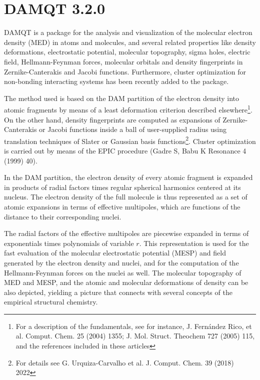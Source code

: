 \documentclass[10pt]{article}
\begin{document}
\maketitle
{}

\newpage

\tableofcontents


\pagebreak

\section*{DAMQT 3.2.0 \label{sec:0}}
DAMQT is a package for the analysis and visualization of the molecular electron density (MED) in 
atoms and molecules, and several related properties like 
density deformations, electrostatic potential, molecular topography, sigma holes, electric field, Hellmann-Feynman forces, 
molecular orbitals and density fingerprints in Zernike-Canterakis and Jacobi functions. 
Furthermore, cluster optimization for non-bonding interacting systems has been recently added to the package.

The method used is based on the DAM partition of the electron density
into atomic fragments by means of a least
deformation criterion described elsewhere\footnote{For a description of the
fundamentals, see for instance, J. Fern\'andez Rico, et al. Comput. Chem. 25
(2004) 1355; J. Mol. Struct. Theochem 727 (2005) 115, and the references
included in these articles}. On the other hand, density fingerprints are computed
as expansions of Zernike-Canterakis or Jacobi functions inside a ball of user-supplied radius
using translation techniques of Slater or Gaussian basis functions\footnote{For details see G. Urquiza-Carvalho et al. J. Comput. Chem. 39 (2018) 2022}.
Cluster optimization is carried out by means of the EPIC procedure (Gadre S, Babu K Resonance 4 (1999) 40).


In the DAM partition, the electron density of every atomic fragment is expanded in
products of radial factors times regular spherical harmonics centered at its
nucleus. The electron density of the full molecule is thus represented as
a set of atomic expansions in terms of effective 
multipoles, which are functions of the distance to their corresponding nuclei.

The radial factors of the effective multipoles are piecewise expanded in
terms of exponentials times polynomials of variable $r$. This representation is
used for the fast evaluation of the molecular electrostatic potential (MESP) and field generated by the electron 
density and nuclei, and for the computation of the
Hellmann-Feynman forces on the nuclei as well. The molecular 
topography of MED and MESP, and the atomic and
molecular deformations of density can be also depicted, yielding a
picture that connects with several concepts of the empirical structural
chemistry.
\end{document}
